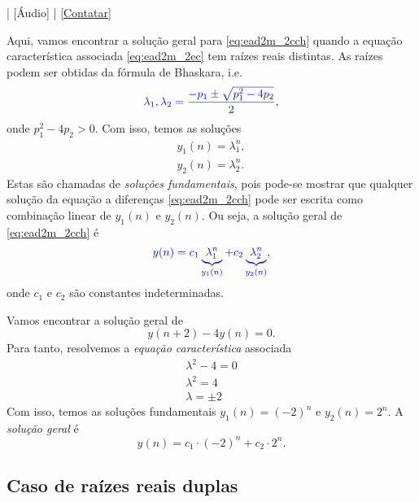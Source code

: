 \begin{flushright}
  [Vídeo] | [Áudio] | \href{https://phkonzen.github.io/notas/contato.html}{[Contatar]}
\end{flushright}

Aqui, vamos encontrar a solução geral para \eqref{eq:ead2m_2cch} quando a equação característica associada \eqref{eq:ead2m_2ec} tem raízes reais distintas. As raízes podem ser obtidas da fórmula de Bhaskara, i.e.
\begin{equation}
  {\color{blue}\lambda_1,\lambda_2 = \frac{-p_1 \pm \sqrt{p_1^2-4p_2}}{2}},
\end{equation}
onde $p_1^2 - 4p_2 > 0$. Com isso, temos as soluções
\begin{gather}
  y_1(n) = \lambda_1^n,\\
  y_2(n) = \lambda_2^n.
\end{gather}
Estas são chamadas de \emph{soluções fundamentais}, pois pode-se mostrar que qualquer solução da equação a diferenças \eqref{eq:ead2m_2cch} pode ser escrita como combinação linear de $y_1(n)$ e $y_2(n)$. Ou seja, a solução geral de \eqref{eq:ead2m_2cch} é
\begin{equation}
  {\color{blue}y(n) = c_1\underbrace{\,\lambda_1^n\,}_{y_1(n)} + c_2\underbrace{\,\lambda_2^n\,}_{y_2(n)}},
\end{equation}
onde $c_1$ e $c_2$ são constantes indeterminadas.

\begin{ex}
  Vamos encontrar a solução geral de
  \begin{equation}
    y(n+2) - 4y(n) = 0.
  \end{equation}
  Para tanto, resolvemos a \emph{equação característica} associada
  \begin{gather}
    \lambda^2 - 4 = 0\\
    \lambda^2 = 4\\
    \lambda = \pm 2
  \end{gather}
  Com isso, temos as soluções fundamentais $y_1(n)=(-2)^n$ e $y_2(n)=2^n$. A \emph{solução geral} é
  \begin{equation}
    y(n) = c_1\cdot (-2)^n + c_2\cdot 2^n.
  \end{equation}
\end{ex}

\subsection{Caso de raízes reais duplas}

